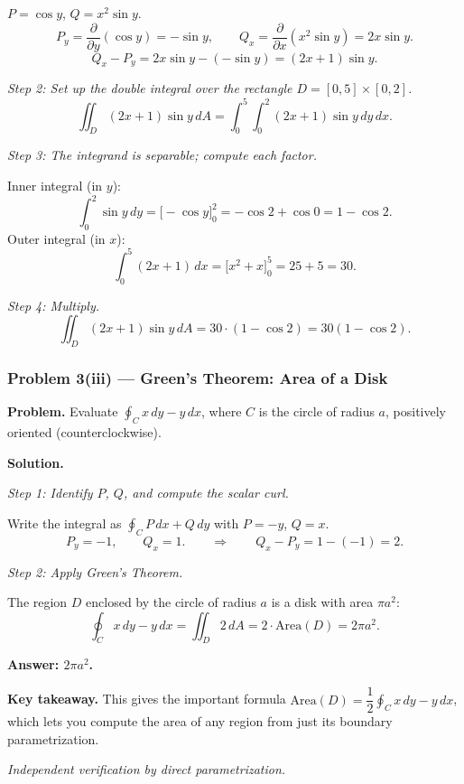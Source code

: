 \documentclass[11pt]{article}
\begin{document}
$P = \cos y$, $Q = x^2\sin y$.
\[
  P_y = \frac{\partial}{\partial y}(\cos y) = -\sin y,
  \qquad
  Q_x = \frac{\partial}{\partial x}(x^2\sin y) = 2x\sin y.
\]
\[
  Q_x - P_y = 2x\sin y - (-\sin y) = (2x+1)\sin y.
\]

\textit{Step 2: Set up the double integral over the rectangle $D = [0,5]\times[0,2]$.}
\[
  \iint_D (2x+1)\sin y\,dA
  = \int_0^5\int_0^2 (2x+1)\sin y\,dy\,dx.
\]

\textit{Step 3: The integrand is separable; compute each factor.}

Inner integral (in $y$):
\[
  \int_0^2 \sin y\,dy = \bigl[-\cos y\bigr]_0^2 = -\cos 2 + \cos 0 = 1 - \cos 2.
\]
Outer integral (in $x$):
\[
  \int_0^5 (2x+1)\,dx = \bigl[x^2 + x\bigr]_0^5 = 25 + 5 = 30.
\]

\textit{Step 4: Multiply.}
\[
  \iint_D (2x+1)\sin y\,dA = 30\cdot(1-\cos 2) = \boxed{30(1-\cos 2)}.
\]

\bigskip
\subsubsection*{Problem 3(iii) --- Green's Theorem: Area of a Disk}

\textbf{Problem.}
Evaluate $\displaystyle\oint_C x\,dy - y\,dx$, where $C$ is the circle of radius $a$, positively oriented (counterclockwise).

\medskip
\textbf{Solution.}

\textit{Step 1: Identify $P$, $Q$, and compute the scalar curl.}

Write the integral as $\oint_C P\,dx + Q\,dy$ with $P = -y$, $Q = x$.
\[
  P_y = -1, \qquad Q_x = 1.
  \qquad\Longrightarrow\qquad Q_x - P_y = 1 - (-1) = 2.
\]

\textit{Step 2: Apply Green's Theorem.}

The region $D$ enclosed by the circle of radius $a$ is a disk with area $\pi a^2$:
\[
  \oint_C x\,dy - y\,dx
  = \iint_D 2\,dA
  = 2\cdot\text{Area}(D)
  = 2\pi a^2.
\]

\textbf{Answer: $\boxed{2\pi a^2}$.}

\textbf{Key takeaway.} This gives the important formula
$\text{Area}(D) = \dfrac{1}{2}\oint_C x\,dy - y\,dx$,
which lets you compute the area of any region from just its boundary parametrization.

\textit{Independent verification by direct parametrization.}
\end{document}
